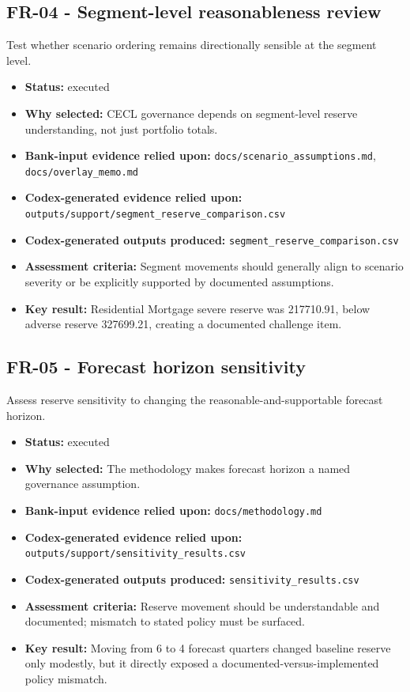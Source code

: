 \documentclass[11pt]{article}
\begin{document}
\subsection*{FR-04 - Segment-level reasonableness review}
Test whether scenario ordering remains directionally sensible at the segment level.
\begin{itemize}
\item \textbf{Status:} executed
\item \textbf{Why selected:} CECL governance depends on segment-level reserve understanding, not just portfolio totals.
\item \textbf{Bank-input evidence relied upon:} \texttt{docs/scenario\_assumptions.md}, \texttt{docs/overlay\_memo.md}
\item \textbf{Codex-generated evidence relied upon:} \texttt{outputs/support/segment\_reserve\_comparison.csv}
\item \textbf{Codex-generated outputs produced:} \texttt{segment\_reserve\_comparison.csv}
\item \textbf{Assessment criteria:} Segment movements should generally align to scenario severity or be explicitly supported by documented assumptions.
\item \textbf{Key result:} Residential Mortgage severe reserve was 217710.91, below adverse reserve 327699.21, creating a documented challenge item.
\end{itemize}
\subsection*{FR-05 - Forecast horizon sensitivity}
Assess reserve sensitivity to changing the reasonable-and-supportable forecast horizon.
\begin{itemize}
\item \textbf{Status:} executed
\item \textbf{Why selected:} The methodology makes forecast horizon a named governance assumption.
\item \textbf{Bank-input evidence relied upon:} \texttt{docs/methodology.md}
\item \textbf{Codex-generated evidence relied upon:} \texttt{outputs/support/sensitivity\_results.csv}
\item \textbf{Codex-generated outputs produced:} \texttt{sensitivity\_results.csv}
\item \textbf{Assessment criteria:} Reserve movement should be understandable and documented; mismatch to stated policy must be surfaced.
\item \textbf{Key result:} Moving from 6 to 4 forecast quarters changed baseline reserve only modestly, but it directly exposed a documented-versus-implemented policy mismatch.
\end{itemize}
\end{document}
